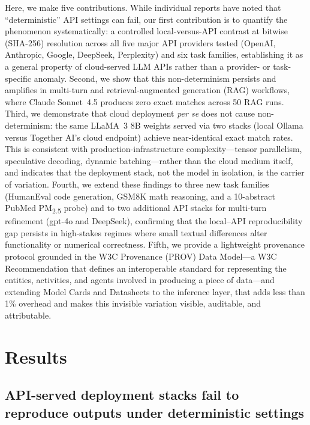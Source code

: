 \documentclass[sn-nature]{sn-jnl}
\begin{document}
Here, we make five contributions.
While individual reports have noted that ``deterministic'' API settings can fail\cite{atil2024nondeterminism,ouyang2024nondeterminism}, our first contribution is to quantify the phenomenon systematically: a controlled local-versus-API contrast at bitwise (SHA-256) resolution across all five major API providers tested (OpenAI, Anthropic, Google, DeepSeek, Perplexity) and six task families, establishing it as a general property of cloud-served LLM APIs rather than a provider- or task-specific anomaly.
Second, we show that this non-determinism persists and amplifies in multi-turn and retrieval-augmented generation (RAG) workflows, where Claude Sonnet~4.5 produces zero exact matches across 50 RAG runs.
Third, we demonstrate that cloud deployment \emph{per se} does not cause non-determinism: the same LLaMA~3 8B weights served via two stacks (local Ollama versus Together AI's cloud endpoint) achieve near-identical exact match rates. This is consistent with production-infrastructure complexity---tensor parallelism, speculative decoding, dynamic batching---rather than the cloud medium itself, and indicates that the deployment stack, not the model in isolation, is the carrier of variation.
Fourth, we extend these findings to three new task families (HumanEval code generation, GSM8K math reasoning, and a 10-abstract PubMed PM\textsubscript{2.5} probe) and to two additional API stacks for multi-turn refinement (gpt-4o and DeepSeek), confirming that the local--API reproducibility gap persists in high-stakes regimes where small textual differences alter functionality or numerical correctness.
Fifth, we provide a lightweight provenance protocol grounded in the W3C Provenance (PROV) Data Model\cite{w3cprov2013}---a W3C Recommendation that defines an interoperable standard for representing the entities, activities, and agents involved in producing a piece of data---and extending Model Cards\cite{mitchell2019model} and Datasheets\cite{gebru2021datasheets} to the inference layer, that adds less than 1\% overhead and makes this invisible variation visible, auditable, and attributable.


\section{Results}\label{sec:results}

\subsection{API-served deployment stacks fail to reproduce outputs under deterministic settings}\label{subsec:greedy}
\end{document}
